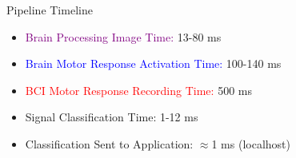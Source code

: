 \begin{frame}{Pipeline Timeline}
    \begin{itemize}
        \item \textcolor{purple}{Brain Processing Image Time:} 13-80 ms
        \item \textcolor{blue}{Brain Motor Response Activation Time:} 100-140 ms
        \item \textcolor{red}{BCI Motor Response Recording Time:} 500 ms
        \item \textcolor{amethyst}{Signal Classification Time:} 1-12 ms
        \item Classification Sent to Application: $\approx$1 ms (localhost)
    \end{itemize}
\end{frame}
